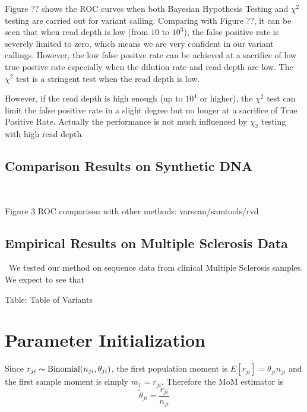 \documentclass[11pt,reqno]{amsart}
\begin{document}
Figure ?? shows the ROC curves when both Bayesian Hypothesis Testing and $\chi^2$ testing are carried out for variant calling. Comparing with Figure ??, it can be seen that when read depth is low (from $10$ to $10^3$), the false positive rate is severely limited to zero, which means we are very confident in our variant callings. However, the low false positve rate can be achieved at a sacrifice of low true postive rate especially when the dilution rate and read depth are low. The $\chi^2$ test is a stringent test when the read depth is low.

However, if the read depth is high enough (up to $10^4$ or higher), the $\chi^2$ test can limit the false positive rate in a slight degree but no longer at a sacrifice of True Positive Rate. Actually the performance is not much influenced by $\chi_2$ testing with high read depth.

\subsection{Comparison Results on Synthetic DNA}\

Figure 3 ROC comparison with other methods: varscan/samtools/rvd


\subsection{Empirical Results on Multiple Sclerosis Data}\
We tested our method on sequence data from clinical Multiple Sclerosis samples. We expect to see that 

Table: Table of Variants



\appendix
\section{Parameter Initialization}\label{sec:appendix_mom}
Since $r_{ji} \thicksim \text{Binomial}(n_{ji}, \theta_{ji})$, the first population moment is  $E[r_{ji}] = \theta_{ji} n_{ji}$ and the first sample moment is simply $m_1 = r_{ji}$. Therefore the MoM estimator is 
\begin{equation}
	\tilde{\theta}_{ji} = \frac{r_{ji}} {n_{ji}}
\end{equation}
\end{document}
